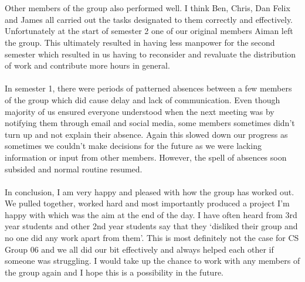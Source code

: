 \documentclass[titlepage]{article}
\begin{document}
{{\\
\\
Other members of the group also performed well. I think Ben, Chris, Dan Felix and James all carried out the tasks designated to them correctly and effectively. Unfortunately at the start of semester 2 one of our original members Aiman left the group. This ultimately resulted in having less manpower for the second semester which resulted in us having to reconsider and revaluate the distribution of work and contribute more hours in general.
\\
\\
In semester 1, there were periods of patterned absences between a few members of the group which did cause delay and lack of communication. Even though majority of us ensured everyone understood when the next meeting was by notifying them through email and social media, some members sometimes didn’t turn up and not explain their absence. Again this slowed down our progress as sometimes we couldn’t make decisions for the future as we were lacking information or input from other members. However, the spell of absences soon subsided and normal routine resumed.
\\
\\
In conclusion, I am very happy and pleased with how the group has worked out. We pulled together, worked hard and most importantly produced a project I'm happy with which was the aim at the end of the day. I have often heard from 3rd year students and other 2nd year students say that they ‘disliked their group and no one did any work apart from them’. This is most definitely not the case for CS Group 06 and we all did our bit effectively and always helped each other if someone was struggling. I would take up the chance to work with any members of the group again and I hope this is a possibility in the future.
}

}
\end{document}
